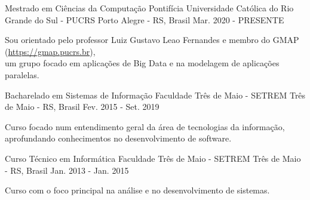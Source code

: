 
\begin{cventries}
	\cventry
	{Mestrado em Ciências da Computação} %
	{Pontifícia Universidade Católica do Rio Grande do Sul - PUCRS} %
	{Porto Alegre - RS, Brasil} %
	{Mar. 2020 - PRESENTE} %
	{
		\begin{cvitems} %
			\item {Sou orientado pelo professor Luiz Gustavo Leao Fernandes e membro do GMAP (\href{https://gmap.pucrs.br}{https://gmap.pucrs.br}),\\um grupo focado em aplicações de Big Data e na modelagem de aplicações paralelas.}
		\end{cvitems}
	}

	\cventry
	{Bacharelado em Sistemas de Informação} %
	{Faculdade Três de Maio - SETREM} %
	{Três de Maio - RS, Brasil} %
	{Fev. 2015 - Set. 2019} %
	{
		\begin{cvitems} %
			\item {Curso focado num entendimento geral da área de tecnologias da informação,\\aprofundando conhecimentos no desenvolvimento de software.}
		\end{cvitems}
	}

	\cventry
	{Curso Técnico em Informática} %
	{Faculdade Três de Maio - SETREM} %
	{Três de Maio - RS, Brasil} %
	{Jan. 2013 - Jan. 2015} %
	{
		\begin{cvitems} %
			\item {Curso com o foco principal na análise e no desenvolvimento de sistemas.}
		\end{cvitems}
	}
\end{cventries}
